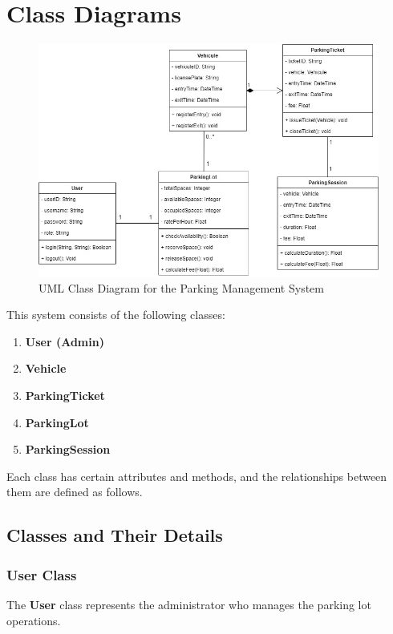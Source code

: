 \section{Class Diagrams}

\begin{figure}[h!]
    \centering
    \includegraphics[width=1\textwidth]{class-diagram/Class_Diagram_Parkinglot_System.jpg} %
    \caption{UML Class Diagram for the Parking Management System}
    \label{fig:uml}
\end{figure}

This system consists of the following classes:

\begin{enumerate}
    \item \textbf{User (Admin)}
    \item \textbf{Vehicle}
    \item \textbf{ParkingTicket}
    \item \textbf{ParkingLot}
    \item \textbf{ParkingSession}
\end{enumerate}

Each class has certain attributes and methods, and the relationships between them are defined as follows.

\subsection{Classes and Their Details}

\subsubsection{User Class}
The \textbf{User} class represents the administrator who manages the parking lot operations.

